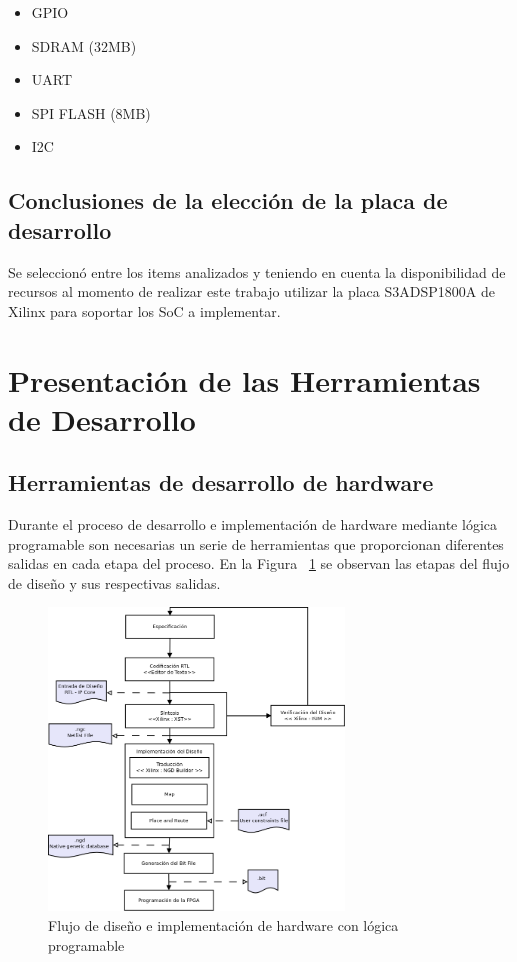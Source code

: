 				\begin{itemize}
				  	\item GPIO
					\item SDRAM (32MB)
					\item UART
					\item SPI FLASH (8MB)
					\item I2C
				\end{itemize}				
				
 		\subsection{Conclusiones de la elección de la placa de desarrollo}
 				Se seleccionó entre los items analizados y teniendo en cuenta la disponibilidad de recursos al momento de realizar este trabajo utilizar la
 				placa S3ADSP1800A de Xilinx para soportar los SoC a implementar.
 		
 		\newpage	
 		\section{Presentación de las Herramientas de Desarrollo} 	 
 				\subsection {Herramientas de desarrollo de hardware}
 				Durante el proceso de desarrollo e implementación de hardware mediante lógica programable son necesarias un serie de herramientas que
 				proporcionan diferentes salidas en cada etapa del proceso. En la Figura ~\ref{fig:designflow} se observan las etapas del flujo de diseño y sus
 				respectivas salidas.
 				
 		\begin{figure}[h!]
 		\begin{center}
  		\includegraphics[width=0.7\textwidth,keepaspectratio=true]{./images/designflow}
  		\caption{Flujo de diseño e implementación de hardware con lógica programable}
  		\label{fig:designflow}
 		\end{center}
		\end{figure}
		
